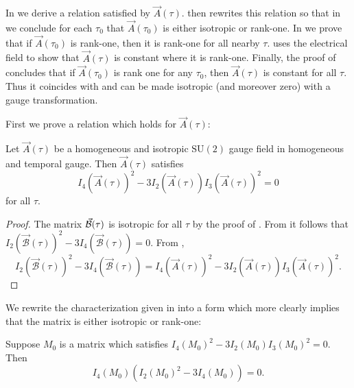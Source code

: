 In  we derive a relation satisfied by $\vec{A}(\tau)$.  then rewrites this relation so that in  we conclude for each $\tau_{0}$ that $\vec{A}(\tau_{0})$ is either isotropic or rank-one. In  we prove that if $\vec{A}(\tau_{0})$ is rank-one, then it is rank-one for all nearby $\tau$.  uses the electrical field to show that $\vec{A}(\tau)$ is constant where it is rank-one. Finally, the proof of  concludes that if $\vec{A}(\tau_{0})$ is rank one for any $\tau_{0}$, then $\vec{A}(\tau)$ is constant for all $\tau$. Thus it coincides with  and can be made isotropic (and moreover zero) with a gauge transformation. 

First we prove a relation which holds for $\vec{A}(\tau)$: 
\begin{lem}
\label{lem:isotropic-gf-relation}Let $\vec{A}(\tau)$ be a homogeneous and isotropic $\mathrm{SU}(2)$ gauge field in homogeneous and temporal gauge. Then $\vec{A}(\tau)$ satisfies 
\[
I_{4}(\vec{A}(\tau))^{2}-3I_{2}(\vec{A}(\tau))I_{3}(\vec{A}(\tau))^{2}=0
\]
 for all $\tau$. 
\end{lem}

\begin{proof}
The matrix $\vec{{\cal B}}(\tau)$ is isotropic for all $\tau$ by the proof of . From  it follows that $I_{2}(\vec{\mathcal{B}}(\tau))^{2}-3I_{4}(\vec{\mathcal{B}}(\tau))=0$. From , 
\[
I_{2}(\vec{\mathcal{B}}(\tau))^{2}-3I_{4}(\vec{\mathcal{B}}(\tau))=I_{4}(\vec{A}(\tau))^{2}-3I_{2}(\vec{A}(\tau))I_{3}(\vec{A}(\tau))^{2}.
\]
\end{proof}
We rewrite the characterization given in  into a form which more clearly implies that the matrix is either isotropic or rank-one:
\begin{lem}
\label{lem:rewrite-isotropic-relation}Suppose $M_{0}$ is a matrix which satisfies $I_{4}(M_{0})^{2}-3I_{2}(M_{0})I_{3}(M_{0})^{2}=0$. Then 
\[
I_{4}(M_{0})\left(I_{2}(M_{0})^{2}-3I_{4}(M_{0})\right)=0.
\]
\end{lem}

